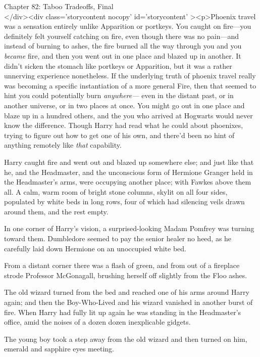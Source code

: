 
Chapter 82: Taboo Tradeoffs, Final\\
</div><div  class='storycontent nocopy' id='storycontent' ><p>Phoenix travel 
was a sensation entirely unlike Apparition or portkeys. You caught on 
fire---you definitely felt yourself catching on fire, even though there was no 
pain---and instead of burning to ashes, the fire burned all the way through you 
and you \emph{became} fire, and then you went out in one place and blazed up in 
another. It didn't sicken the stomach like portkeys or Apparition, but it was a 
rather unnerving experience nonetheless. If the underlying truth of phoenix 
travel really was becoming a specific instantiation of a more general Fire, 
then that seemed to hint you could potentially burn \emph{anywhere---} even in 
the distant past, or in another universe, or in two places at once. You might 
go out in one place and blaze up in a hundred others, and the you who arrived 
at Hogwarts would never know the difference. Though Harry had read what he 
could about phoenixes, trying to figure out how to get one of his own, and 
there'd been no hint of anything remotely like \emph{that} capability.

Harry caught fire and went out and blazed up somewhere else; and just like that 
he, and the Headmaster, and the unconscious form of Hermione Granger held in 
the Headmaster's arms, were occupying another place; with Fawkes above them 
all. A calm, warm room of bright stone columns, skylit on all four sides, 
populated by white beds in long rows, four of which had silencing veils drawn 
around them, and the rest empty.

In one corner of Harry's vision, a surprised-looking Madam Pomfrey was turning 
toward them. Dumbledore seemed to pay the senior healer no heed, as he 
carefully laid down Hermione on an unoccupied white bed.

From a distant corner there was a flash of green, and from out of a fireplace 
strode Professor McGonagall, brushing herself off slightly from the Floo ashes.

The old wizard turned from the bed and reached one of his arms around Harry 
again; and then the Boy-Who-Lived and his wizard vanished in another burst of 
fire.
\sbreak
When Harry had fully lit up again he was standing in the Headmaster's office, 
amid the noises of a dozen dozen inexplicable gidgets.

The young boy took a step away from the old wizard and then turned on him, 
emerald and sapphire eyes meeting.

